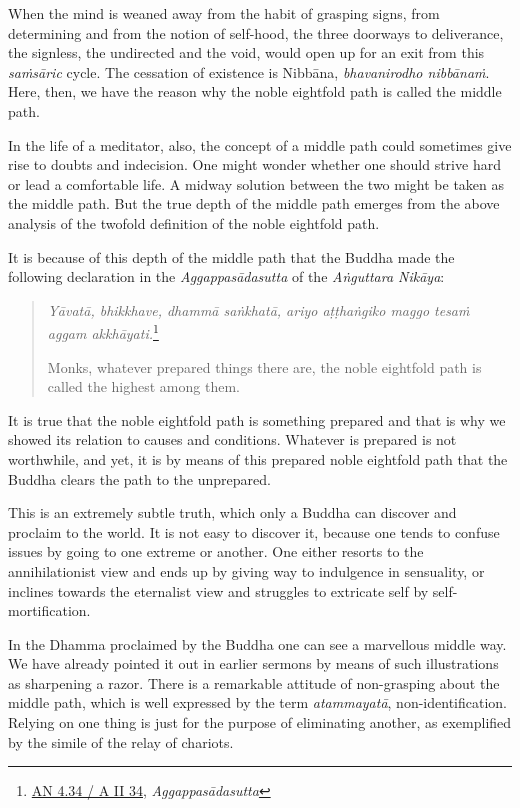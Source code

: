 When the mind is weaned away from the habit of grasping signs, from determining and from the notion of self-hood, the three doorways to deliverance, the signless, the undirected and the void, would open up for an exit from this \emph{saṁsāric} cycle. The cessation of existence is Nibbāna, \emph{bhavanirodho nibbānaṁ}. Here, then, we have the reason why the noble eightfold path is called the middle path.

In the life of a meditator, also, the concept of a middle path could sometimes give rise to doubts and indecision. One might wonder whether one should strive hard or lead a comfortable life. A midway solution between the two might be taken as the middle path. But the true depth of the middle path emerges from the above analysis of the twofold definition of the noble eightfold path.

It is because of this depth of the middle path that the Buddha made the following declaration in the \emph{Aggappasādasutta} of the \emph{Aṅguttara Nikāya}:

\begin{quote}
\emph{Yāvatā, bhikkhave, dhammā saṅkhatā, ariyo aṭṭhaṅgiko maggo tesaṁ aggam akkhāyati.}\footnote{\href{https://suttacentral.net/an4.34/pli/ms}{AN 4.34 / A II 34}, \emph{Aggappasādasutta}}

Monks, whatever prepared things there are, the noble eightfold path is called the highest among them.
\end{quote}

It is true that the noble eightfold path is something prepared and that is why we showed its relation to causes and conditions. Whatever is prepared is not worthwhile, and yet, it is by means of this prepared noble eightfold path that the Buddha clears the path to the unprepared.

This is an extremely subtle truth, which only a Buddha can discover and proclaim to the world. It is not easy to discover it, because one tends to confuse issues by going to one extreme or another. One either resorts to the annihilationist view and ends up by giving way to indulgence in sensuality, or inclines towards the eternalist view and struggles to extricate self by self-mortification.

\enlargethispage{\baselineskip}

In the Dhamma proclaimed by the Buddha one can see a marvellous middle way. We have already pointed it out in earlier sermons by means of such illustrations as sharpening a razor. There is a remarkable attitude of non-grasping about the middle path, which is well expressed by the term \emph{atammayatā}, non-identification. Relying on one thing is just for the purpose of eliminating another, as exemplified by the simile of the relay of chariots.

